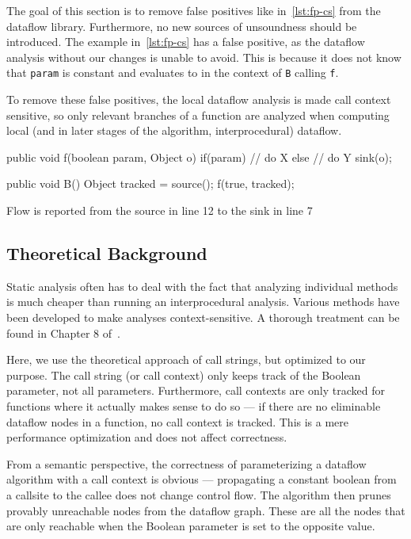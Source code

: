 The goal of this section is to remove false positives like in~\autoref{lst:fp-cs}
from the dataflow library.
Furthermore, no new sources of unsoundness should be introduced.
The example in~\autoref{lst:fp-cs} has a false positive,
as the dataflow analysis without our changes is unable to avoid.
This is because it does not know that \texttt{param} is constant and evaluates 
to 
in the context of \texttt{B} calling \texttt{f}.

To remove these false positives, the local dataflow 
analysis is made call context sensitive, so only relevant branches of a function
are analyzed when computing local 
(and in later stages of the algorithm, interprocedural) dataflow.

\begin{listing}
    \begin{javacode}
public void f(boolean param, Object o) {
    if(param) {
        // do X
    }
    else {
        // do Y
        sink(o);
    }
}

public void B() {
    Object tracked = source();
    f(true, tracked);
}
        \end{javacode}
    \caption{Flow is reported from the source in line 12 to the sink in line 7}
    \label{lst:fp-cs}
\end{listing}


\subsection{Theoretical Background}
Static analysis often has to deal with the fact that analyzing individual methods 
is much cheaper than running an interprocedural analysis.
Various methods have been developed to make analyses context-sensitive.
A thorough treatment can be found in Chapter 8 of~\cite{spa}.

Here, we use the theoretical approach of call strings, but optimized to our purpose.
The call string (or call context) only keeps track of the Boolean parameter, not
all parameters.
Furthermore, call contexts are only tracked for functions where it actually makes sense 
to do so --- if there are no eliminable dataflow nodes in a function,
no call context is tracked.
This is a mere performance optimization and does not affect correctness.

From a semantic perspective, the correctness of parameterizing a
dataflow algorithm with a call context is obvious ---
propagating a constant boolean from a callsite to the callee does not change 
control flow.
The algorithm then prunes provably unreachable nodes from the dataflow graph.
These are all the nodes that are only reachable when the Boolean parameter is set
to the opposite value.

